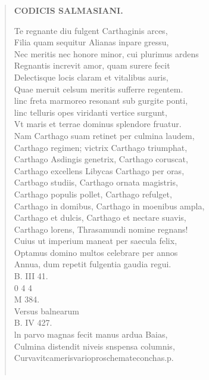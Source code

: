 \documentclass[11pt, a4paper]{report}
\begin{document}
\begin{verse}
     \marginpar{[289]} \begin{center} \textbf{CODICIS SALMASIANI.} \end{center}Te regnante diu fulgent Carthaginis arces, \\ Filia quam sequitur Alianas inpare gressu, \\ Nec meritis nec honore minor, cui plurimus ardens \\ Regnantis increvit amor, quam surere fecit \\ Delectisque locis claram  \lbrack et vitalibus auris, \\ Quae meruit celsum meritis sufferre regentem. \\ linc freta marmoreo resonant sub gurgite ponti, \\ linc telluris opes viridanti vertice surgunt, \\ Vt maris et terrae dominus splendore fruatur. \\ Nam Carthago suam retinet per culmina laudem, \\ Carthago regimen; victrix Carthago triumphat, \\ Carthago Asdingis genetrix, Carthago coruscat, \\ Carthago excellens Libycas Carthago per oras, \\ Cartbago studiis, Carthago ornata magistris, \\ Carthago populis pollet, Carthago refulget, \\ Carthago in domibus, Carthago in moenibus ampla, \\ Carthago et dulcis, Carthago et nectare suavis, \\ Carthago lorens, Thrasamundi nomine regnans! \\ Cuius ut imperium maneat per saecula felix, \\ Optamus domino multos celebrare per annos \\ Annua, dum repetit fulgentia gaudia regui. \\ B. III 41. \\ 0 4 4 \\ M 384. \\ Versus balnearum \\ B. IV 427. \\ ln parvo magnas fecit manus ardua Baias, \\ Culmina distendit niveis snspensa columnis, \\ Curvavitcamerisvarioproschemateconchas.p. \\ 
        ﻿\pagebreak 

\end{verse}
\end{document}
